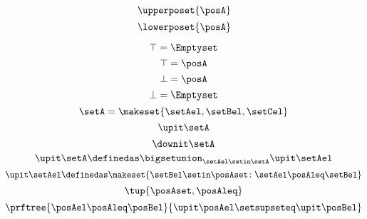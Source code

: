 \begin{forslides}
    \begin{equation*}
        \label{eq:upperposet-def}
        \upperposet{\posA}
    \end{equation*}
    \begin{equation*}
        \label{eq:lowerposet-def}
        \lowerposet{\posA}
    \end{equation*}

    \begin{equation*}
        \label{eq:designlecture-topa}
        \top=\Emptyset
    \end{equation*}
    \begin{equation*}
        \label{eq:designlecture-topb}
        \top=\posA
    \end{equation*}
    \begin{equation*}
        \label{eq:designlecture-bota}
        \bot=\posA
    \end{equation*}
    \begin{equation*}
        \label{eq:designlecture-botb}
        \bot=\Emptyset
    \end{equation*}
    \begin{equation*}
        \label{eq:designlecture-upa}
        \setA=\makeset{\setAel,\setBel,\setCel}
    \end{equation*}
    \begin{equation*}
        \label{eq:designlecture-upb}
        \upit \setA
    \end{equation*}
    \begin{equation*}
        \label{eq:designlecture-upc}
        \downit \setA
    \end{equation*}
    \begin{equation*}
        \label{eq:designlecture-upd}
        \upit \setA \definedas \bigsetunion_{\setAel \setin \setA}\upit \setAel
    \end{equation*}
    \begin{equation*}
        \label{eq:designlecture-upe}
        \upit \setAel \definedas \makeset{\setBel \setin \posAset \colon \setAel \posAleq \setBel}
    \end{equation*}
    \begin{equation*}
        \label{eq:designlecture-upf}
        \tup{\posAset,\posAleq}
    \end{equation*}
    \begin{equation*}
        \label{eq:designlecture-upg}
        \prftree{\posAel\posAleq \posBel}{\upit \posAel \setsupseteq \upit \posBel}
    \end{equation*}
\end{forslides}
